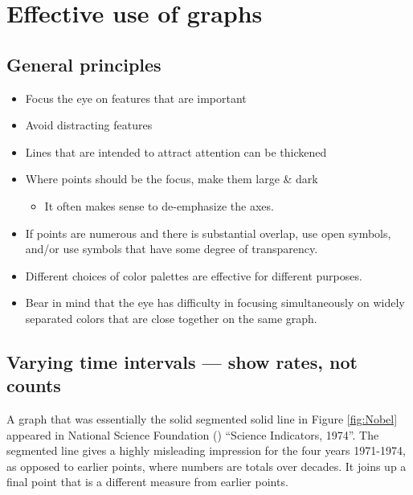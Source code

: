 \documentclass[
  10ptls,
  b5paper]{book}
\providecommand{\tightlist}{%
  \setlength{\itemsep}{0pt}\setlength{\parskip}{0pt}}
\begin{document}
\chapter{Effective use of graphs}\label{effective-use-of-graphs}

\section{General principles}\label{general-principles}

\begin{itemize}
\tightlist
\item
  Focus the eye on features that are important
\item
  Avoid distracting features
\item
  Lines that are intended to attract attention can be thickened
\item
  Where points should be the focus, make them large \& dark

  \begin{itemize}
  \tightlist
  \item
    It often makes sense to de-emphasize the axes.
  \end{itemize}
\item
  If points are numerous and there is substantial overlap, use open symbols, and/or use symbols that have some degree of transparency.
\item
  Different choices of color palettes are effective for different purposes.
\item
  Bear in mind that the eye has difficulty in focusing simultaneously on widely separated colors that are close together on the same graph.
\end{itemize}

\section{Varying time intervals --- show rates, not counts}\label{varying-time-intervals-show-rates-not-counts}

A graph that was essentially the solid segmented solid line in Figure \ref{fig:Nobel} appeared in National Science Foundation () ``Science Indicators, 1974''. The segmented line gives a highly misleading impression for the four years 1971-1974, as opposed to earlier points, where numbers are totals over decades. It joins up a final point that is a different measure from earlier points.
\end{document}

